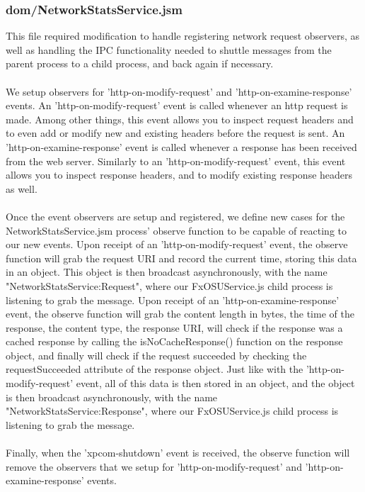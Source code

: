 \documentclass[12pt]{article}
\begin{document}
\subsubsection{dom/NetworkStatsService.jsm}
This file required modification to handle registering network request observers, as well as handling the IPC functionality needed to shuttle messages from the parent process to a child process, and back again if necessary.
\\\\
We setup observers for 'http-on-modify-request' and 'http-on-examine-response' events. An 'http-on-modify-request' event is called whenever an http request is made. Among other things, this event allows you to inspect request headers and to even add or modify new and existing headers before the request is sent. An 'http-on-examine-response' event is called whenever a response has been received from the web server. Similarly to an 'http-on-modify-request' event, this event allows you to inspect response headers, and to modify existing response headers as well.
\\\\
Once the event observers are setup and registered, we define new cases for the NetworkStatsService.jsm process' observe function to be capable of reacting to our new events. Upon receipt of an 'http-on-modify-request' event, the observe function will grab the request URI and record the current time, storing this data in an object. This object is then broadcast asynchronously, with the name "NetworkStatsService:Request", where our FxOSUService.js child process is listening to grab the message. Upon receipt of an 'http-on-examine-response' event, the observe function will grab the content length in bytes, the time of the response, the content type, the response URI, will check if the response was a cached response by calling the isNoCacheResponse() function on the response object, and finally will check if the request succeeded by checking the requestSucceeded attribute of the response object. Just like with the 'http-on-modify-request' event, all of this data is then stored in an object, and the object is then broadcast asynchronously, with the name "NetworkStatsService:Response", where our FxOSUService.js child process is listening to grab the message.
\\\\
Finally, when the 'xpcom-shutdown' event is received, the observe function will remove the observers that we setup for 'http-on-modify-request' and 'http-on-examine-response' events.
\end{document}
